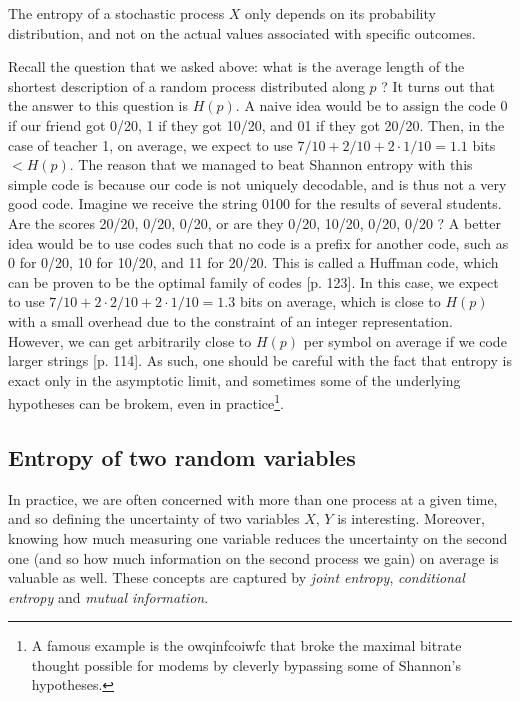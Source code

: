 \begin{remark}
    The entropy of a stochastic process $X$ only depends on its probability distribution, and not on the actual values associated with specific outcomes.
\end{remark}

Recall the question that we asked above: what is the average length of the shortest description of a random process distributed along $p$ ? It turns out that the answer to this question is $H(p)$. A naive idea would be to assign the code 0 if our friend got 0/20, 1 if they got 10/20, and 01 if they got 20/20. Then, in the case of teacher 1, on average, we expect to use $7/10 + 2/10 + 2 \cdot 1/10 = 1.1$ bits $< H(p)$. The reason that we managed to beat Shannon entropy with this simple code is because our code is not uniquely decodable, and is thus not a very good code. Imagine we receive the string 0100 for the results of several students. Are the scores 20/20, 0/20, 0/20, or are they 0/20, 10/20, 0/20, 0/20 ? A better idea would be to use codes such that no code is a prefix for another code, such as 0 for 0/20, 10 for 10/20, and 11 for 20/20. This is called a Huffman code, which can be proven to be the optimal family of codes \cite{cover_elements_2006}[p. 123]. In this case, we expect to use $7/10 + 2 \cdot 2/10 + 2 \cdot 1/10 = 1.3$ bits on average, which is close to $H(p)$ with a small overhead due to the constraint of an integer representation. However, we can get arbitrarily close to $H(p)$ per symbol on average if we code larger strings \cite{cover_elements_2006}[p. 114]. As such, one should be careful with the fact that entropy is exact only in the asymptotic limit, and sometimes some of the underlying hypotheses can be brokem, even in practice\footnote{A famous example is the owqinfcoiwfc that broke the maximal bitrate thought possible for modems by cleverly bypassing some of Shannon's hypotheses.}. %



\subsection{Entropy of two random variables} %

In practice, we are often concerned with more than one process at a given time, and so defining the uncertainty of two variables $X$, $Y$ is interesting. Moreover, knowing how much measuring one variable reduces the uncertainty on the second one (and so how much information on the second process we gain) on average is valuable as well. These concepts are captured by \textit{joint entropy}, \textit{conditional entropy} and \textit{mutual information}.

